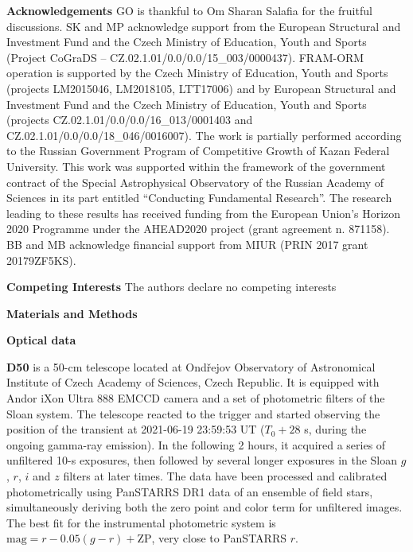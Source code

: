 \documentclass{naturesubmissionstyle}
\begin{document}
\clearpage

{\noindent  \bf Acknowledgements} 
GO is thankful to Om Sharan Salafia for the fruitful discussions.  SK and MP acknowledge support from the European Structural and Investment Fund and the Czech Ministry of Education, Youth and Sports \\
(Project CoGraDS -- CZ.02.1.01/0.0/0.0/15\_003/0000437).
FRAM-ORM operation is supported by the Czech Ministry of Education, Youth and Sports (projects LM2015046, LM2018105, LTT17006) and by European Structural and Investment Fund and the Czech Ministry of Education, Youth and Sports (projects CZ.02.1.01/0.0/0.0/16\_013/0001403 and CZ.02.1.01/0.0/0.0/18\_046/0016007).
The work is partially performed according to the Russian Government Program of Competitive Growth of Kazan Federal University.
This work was supported within the framework of the government
contract of the Special Astrophysical Observatory of the Russian
Academy of Sciences in its part entitled ``Conducting Fundamental
Research''. The research leading to these results has received funding from the European Union’s Horizon 2020 Programme under the AHEAD2020 project (grant agreement n. 871158). BB and MB acknowledge financial support from MIUR (PRIN 2017 grant 20179ZF5KS). 


{\noindent  \bf Competing Interests} The authors declare no competing
interests





\clearpage

{\noindent \bf Materials and Methods}
\setcounter{figure}{0}
\setcounter{table}{0}
\renewcommand{\thefigure}{S\arabic{figure}}
\renewcommand{\thetable}{S\arabic{table}}

{\noindent \bf  Optical data} 

{\bf D50} \cite{d50} is a 50-cm telescope located at Ondřejov Observatory of Astronomical Institute of Czech Academy of Sciences, Czech Republic. It is equipped with Andor iXon Ultra 888 EMCCD camera and a set of photometric filters of the Sloan system. The telescope reacted to the trigger and started observing the position of the transient at 2021-06-19 23:59:53 UT ($T_0+28$ s, during the ongoing gamma-ray emission). In the following 2 hours, it acquired a series of unfiltered 10-s exposures, then followed by several longer exposures in the Sloan $g$, $r$, $i$ and $z$ filters at later times. The data have been processed and calibrated photometrically using PanSTARRS DR1 \cite{ps1} data of an ensemble of field stars, simultaneously deriving both the zero point and color term for unfiltered images. The best fit for the instrumental photometric system is $\mbox{mag} = r - 0.05(g - r) + \mbox{ZP}$, %
very close to PanSTARRS $r$.
\end{document}
